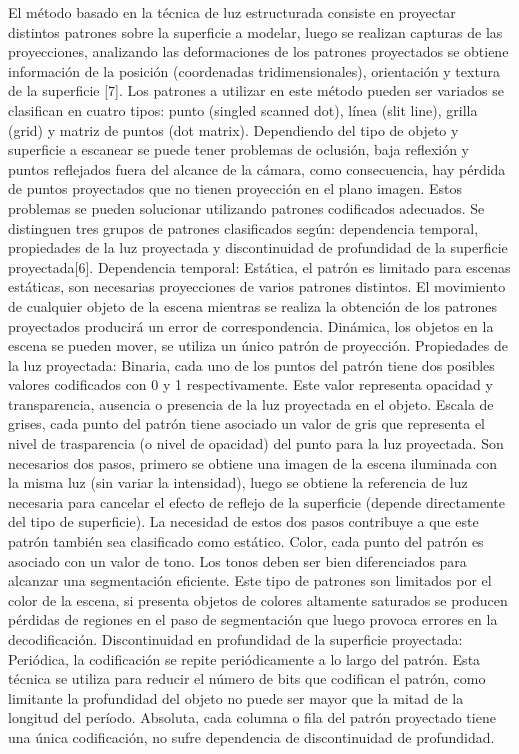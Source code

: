El método basado en la técnica de luz estructurada consiste en proyectar distintos patrones sobre la superficie a modelar, luego se realizan capturas de las proyecciones, analizando las deformaciones de los patrones proyectados se obtiene información de la posición (coordenadas tridimensionales), orientación y textura de la superficie [7].
Los patrones a utilizar en este método pueden ser variados se clasifican en cuatro tipos: punto (singled scanned dot), línea (slit line), grilla (grid) y matriz de puntos (dot matrix).
Dependiendo del tipo de objeto y superficie a escanear se puede tener problemas de oclusión, baja reflexión y puntos reflejados fuera del alcance de la cámara, como consecuencia, hay pérdida de puntos proyectados que no tienen proyección en el plano imagen.
Estos problemas se pueden solucionar utilizando patrones codificados adecuados. Se distinguen tres grupos de patrones clasificados según: dependencia temporal, propiedades de la luz proyectada y discontinuidad de profundidad de la superficie proyectada[6].
   Dependencia  temporal:
   Estática, el patrón es limitado para escenas estáticas, son necesarias proyecciones de varios patrones distintos. El movimiento de cualquier objeto de la escena mientras se realiza la obtención de los patrones proyectados producirá un error de correspondencia.
   Dinámica, los objetos en la escena se pueden mover, se utiliza un único patrón de proyección.
   Propiedades de la luz proyectada:
   Binaria, cada uno de los puntos del patrón tiene dos posibles valores codificados con 0 y 1 respectivamente. Este valor representa opacidad y transparencia, ausencia o presencia de la luz proyectada en el objeto.
   Escala de grises, cada punto del patrón tiene asociado un valor de gris que representa el nivel de trasparencia (o nivel de opacidad) del punto para la luz proyectada. Son necesarios dos pasos, primero se obtiene una imagen de la escena iluminada con la misma luz (sin variar la intensidad), luego se obtiene la referencia de luz necesaria para cancelar el efecto de reflejo de la superficie (depende directamente del tipo de superficie). La necesidad de estos dos pasos contribuye a que este patrón también sea clasificado como estático.
   Color, cada punto del patrón es asociado con un valor de tono. Los tonos deben ser bien diferenciados para alcanzar una segmentación eficiente. Este tipo de patrones son limitados por el color de la escena, si presenta objetos de colores altamente saturados se producen pérdidas de regiones en el paso de segmentación que luego provoca errores en la decodificación.
   Discontinuidad en profundidad de la superficie proyectada:
   Periódica, la codificación se repite periódicamente a lo largo del patrón. Esta  técnica se utiliza para reducir el número de bits que codifican el patrón,
como limitante la profundidad del objeto no puede ser mayor que la mitad de la longitud del período.
   Absoluta, cada columna o fila del patrón proyectado tiene una única codificación, no sufre dependencia de discontinuidad de profundidad.
   
